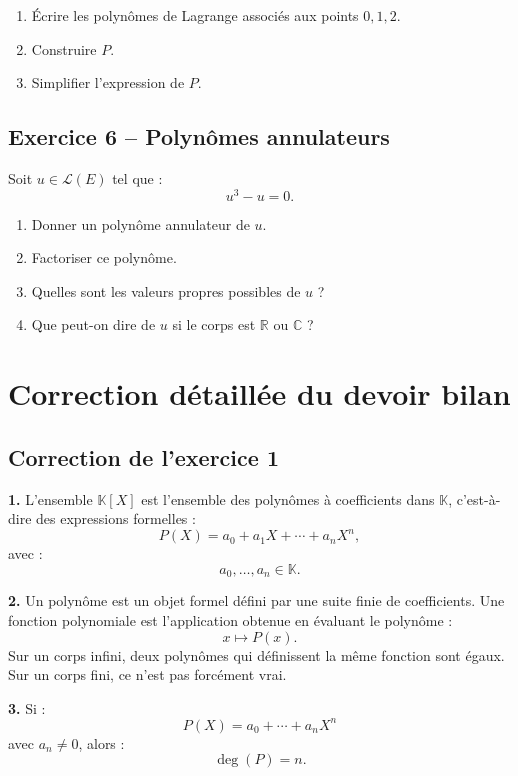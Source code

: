 \documentclass[11pt,a4paper]{article}
\newcommand{\K}{\mathbb K}
\newcommand{\R}{\mathbb R}
\newcommand{\C}{\mathbb C}
\begin{document}
\begin{enumerate}
    \item Écrire les polynômes de Lagrange associés aux points \(0,1,2\).
    \item Construire \(P\).
    \item Simplifier l'expression de \(P\).
\end{enumerate}

\subsection*{Exercice 6 -- Polynômes annulateurs}

Soit \(u\in\mathcal L(E)\) tel que :
\[
u^3-u=0.
\]

\begin{enumerate}
    \item Donner un polynôme annulateur de \(u\).
    \item Factoriser ce polynôme.
    \item Quelles sont les valeurs propres possibles de \(u\) ?
    \item Que peut-on dire de \(u\) si le corps est \(\R\) ou \(\C\) ?
\end{enumerate}

\newpage

\section{Correction détaillée du devoir bilan}

\subsection*{Correction de l'exercice 1}

\textbf{1.}  
L'ensemble \(\K[X]\) est l'ensemble des polynômes à coefficients dans \(\K\), c'est-à-dire des expressions formelles :
\[
P(X)=a_0+a_1X+\cdots+a_nX^n,
\]
avec :
\[
a_0,\dots,a_n\in\K.
\]

\textbf{2.}  
Un polynôme est un objet formel défini par une suite finie de coefficients.  
Une fonction polynomiale est l'application obtenue en évaluant le polynôme :
\[
x\mapsto P(x).
\]
Sur un corps infini, deux polynômes qui définissent la même fonction sont égaux.  
Sur un corps fini, ce n'est pas forcément vrai.

\textbf{3.}  
Si :
\[
P(X)=a_0+\cdots+a_nX^n
\]
avec \(a_n\neq0\), alors :
\[
\deg(P)=n.
\]
\end{document}
